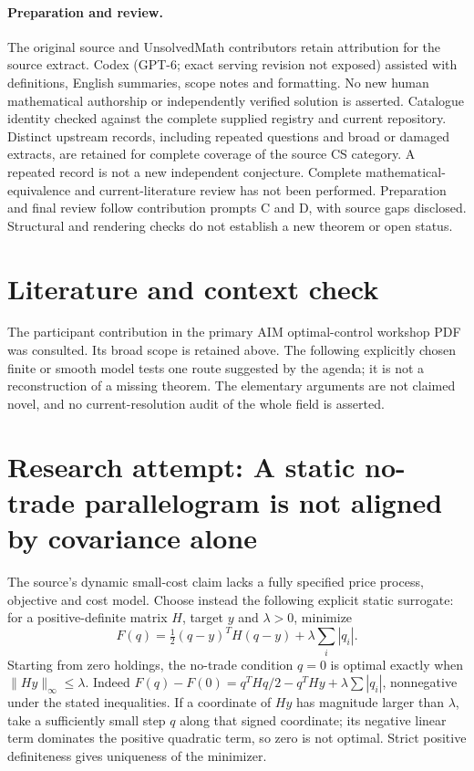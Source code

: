 \documentclass[11pt]{article}
\begin{document}
\paragraph{Preparation and review.}
The original source and UnsolvedMath contributors retain attribution for the source extract. Codex (GPT-6; exact serving revision not exposed) assisted with definitions, English summaries, scope notes and formatting. No new human mathematical authorship or independently verified solution is asserted. Catalogue identity checked against the complete supplied registry and current repository. Distinct upstream records, including repeated questions and broad or damaged extracts, are retained for complete coverage of the source CS category. A repeated record is not a new independent conjecture. Complete mathematical-equivalence and current-literature review has not been performed. Preparation and final review follow contribution prompts C and D, with source gaps disclosed. Structural and rendering checks do not establish a new theorem or open status.
\label{end:statement}

\section{Literature and context check}
The participant contribution in the primary AIM optimal-control workshop
 PDF was consulted. Its broad scope is retained above. The following explicitly
 chosen finite or smooth model tests one route suggested by the agenda; it is
 not a reconstruction of a missing theorem. The elementary arguments are not
 claimed novel, and no current-resolution audit of the whole field is asserted.
\section{Research attempt: A static no-trade parallelogram is not aligned by covariance alone}
The source's dynamic small-cost claim lacks a fully specified price process,
objective and cost model. Choose instead the following explicit static surrogate:
for a positive-definite matrix $H$, target $y$ and $\lambda>0$, minimize
\[
 F(q)=\tfrac12(q-y)^TH(q-y)+\lambda\sum_i|q_i|.
\]
Starting from zero holdings, the no-trade condition $q=0$ is optimal exactly
when $\|Hy\|_\infty\le\lambda$. Indeed
$F(q)-F(0)=q^THq/2-q^THy+\lambda\sum|q_i|$, nonnegative under the stated
inequalities. If a coordinate of $Hy$ has magnitude larger than $\lambda$,
take a sufficiently small step $q$ along that signed coordinate; its negative
linear term dominates the positive quadratic term, so zero is not optimal.
Strict positive definiteness gives uniqueness of the minimizer.
\end{document}
